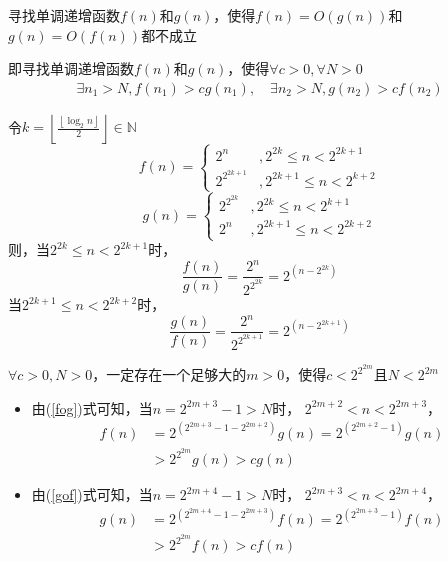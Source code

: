\begin{questions}

    \question 寻找单调递增函数$f(n)$和$g(n)$，使得$f(n)=O(g(n))$和$g(n)=O(f(n))$都不成立

    \begin{solution}
        即寻找单调递增函数$f(n)$和$g(n)$，使得$\forall c > 0, \forall N > 0$ \begin{align*}
            \exists n_1 > N, f(n_1) > c g(n_1) , \quad
            \exists n_2 > N, g(n_2) > c f(n_2)
        \end{align*}

        令$k = \left\lfloor \frac{\left\lfloor \log_2{n} \right\rfloor}{2} \right\rfloor \in\mathbb{N}$
        $$
            f(n) = \begin{cases}
                2^n          & , 2^{2k} \leq n < 2^{2k+1}  \\
                2^{2^{2k+1}} & , 2^{2k+1} \leq n < 2^{k+2}
            \end{cases}
        $$
        $$
            g(n) = \begin{cases}
                2^{2^{2k}} & , 2^{2k} \leq n < 2^{k+1}    \\
                2^n        & , 2^{2k+1} \leq n < 2^{2k+2}
            \end{cases}
        $$
        则，当$2^{2k} \leq n < 2^{2k+1}$时，
        \begin{equation} \label{fog}
            \frac{f(n)}{g(n)} = \frac{2^n}{2^{2^{2k}}} = 2^{(n-2^{2k})}
        \end{equation}
        当$2^{2k+1} \leq n < 2^{2k+2}$时，
        \begin{equation} \label{gof}
            \frac{g(n)}{f(n)} = \frac{2^n}{2^{2^{2k+1}}} = 2^{(n-2^{2k+1})}
        \end{equation}

        $\forall c > 0, N > 0$，一定存在一个足够大的$m > 0$，使得$c < 2^{2^{2m}}$且$N < 2^{2m}$
        \begin{itemize}
            \item 由(\ref{fog})式可知，当$n = 2^{2m+3}-1 > N$时，
                  $2^{2m+2} < n < 2^{2m + 3}$，
                  \begin{align*}
                      f(n) & = 2^{(2^{2m+3}-1-2^{2m+2})} g(n) = 2^{(2^{2m+2}-1)} g(n) \\
                           & > 2^{2^{2m}} g(n) > c g(n)
                  \end{align*}
            \item 由(\ref{gof})式可知，当$n = 2^{2m+4}-1 > N$时，
                  $2^{2m + 3} < n < 2^{2m + 4}$，
                  \begin{align*}
                      g(n) & = 2^{(2^{2m+4}-1-2^{2m+3})} f(n) = 2^{(2^{2m+3}-1)} f(n) \\
                           & > 2^{2^{2m}} f(n) > c f(n)
                  \end{align*}
        \end{itemize}


\end{solution}
\end{questions}
